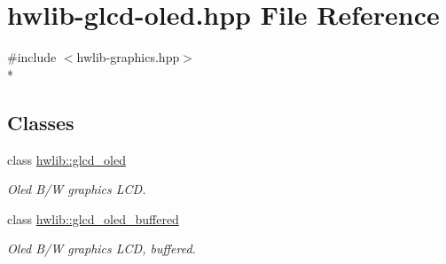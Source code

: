 \hypertarget{hwlib-glcd-oled_8hpp}{}\section{hwlib-\/glcd-\/oled.hpp File Reference}
\label{hwlib-glcd-oled_8hpp}
{\ttfamily \#include $<$hwlib-\/graphics.\+hpp$>$}\\*
\subsection*{Classes}
\begin{DoxyCompactItemize}
\item 
class \hyperlink{classhwlib_1_1glcd__oled}{hwlib\+::glcd\+\_\+oled}
\begin{DoxyCompactList}\small\item\em Oled B/W graphics L\+CD. \end{DoxyCompactList}\item 
class \hyperlink{classhwlib_1_1glcd__oled__buffered}{hwlib\+::glcd\+\_\+oled\+\_\+buffered}
\begin{DoxyCompactList}\small\item\em Oled B/W graphics L\+CD, buffered. \end{DoxyCompactList}\end{DoxyCompactItemize}
